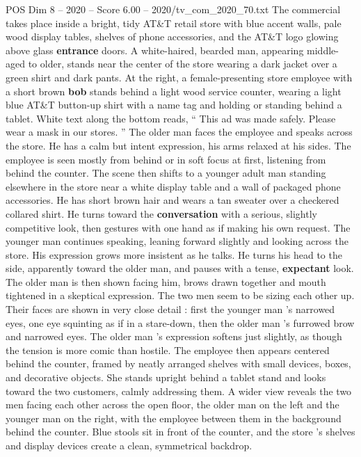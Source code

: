 \begin{textsample}{POS Dim 8 – 2020 – Score 6.00 – 2020/tv\_com\_2020\_70.txt}  \label{ex:f8_pos_057}
The commercial takes place inside a bright, tidy AT\&T retail store with blue accent walls, pale wood display tables, shelves of phone accessories, and the AT\&T logo glowing above glass \textbf{entrance} doors.
A white-haired, bearded man, appearing middle-aged to older, stands near the center of the store wearing a dark jacket over a green shirt and dark pants.
At the right, a female-presenting store employee with a short brown \textbf{bob} stands behind a light wood service counter, wearing a light blue AT\&T button-up shirt with a name tag and holding or standing behind a tablet.
White text along the bottom reads, “ This ad was made safely.
Please wear a mask in our stores. ” The older man faces the employee and speaks across the store.
He has a calm but intent expression, his arms relaxed at his sides.
The employee is seen mostly from behind or in soft focus at first, listening from behind the counter.
The scene then shifts to a younger adult man standing elsewhere in the store near a white display table and a wall of packaged phone accessories.
He has short brown hair and wears a tan sweater over a checkered collared shirt.
He turns toward the \textbf{conversation} with a serious, slightly competitive look, then gestures with one hand as if making his own request.
The younger man continues speaking, leaning forward slightly and looking across the store.
His expression grows more insistent as he talks.
He turns his head to the side, apparently toward the older man, and pauses with a tense, \textbf{expectant} look.
The older man is then shown facing him, brows drawn together and mouth tightened in a skeptical expression.
The two men seem to be sizing each other up.
Their faces are shown in very close detail : first the younger man ’s narrowed eyes, one eye squinting as if in a stare-down, then the older man ’s furrowed brow and narrowed eyes.
The older man ’s expression softens just slightly, as though the tension is more comic than hostile.
The employee then appears centered behind the counter, framed by neatly arranged shelves with small devices, boxes, and decorative objects.
She stands upright behind a tablet stand and looks toward the two customers, calmly addressing them.
A wider view reveals the two men facing each other across the open floor, the older man on the left and the younger man on the right, with the employee between them in the background behind the counter.
Blue stools sit in front of the counter, and the store ’s shelves and display devices create a clean, symmetrical backdrop.

\end{textsample}

